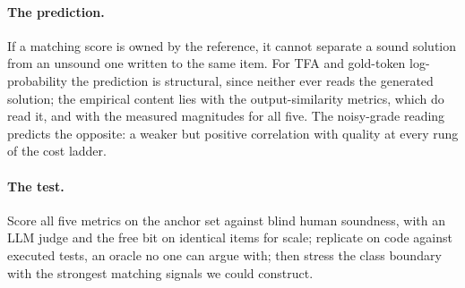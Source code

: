 \documentclass[11pt]{article}
\newcommand{\tfa}{\textsc{TFA}}
\begin{document}
\paragraph{The prediction.}
If a matching score is owned by the reference, it cannot separate a sound solution from an unsound one written to the same item.
For \tfa{} and gold-token log-probability the prediction is structural, since neither ever reads the generated solution; the empirical content lies with the output-similarity metrics, which do read it, and with the measured magnitudes for all five.
The noisy-grade reading predicts the opposite: a weaker but positive correlation with quality at every rung of the cost ladder.

\paragraph{The test.}
Score all five metrics on the anchor set against blind human soundness, with an LLM judge and the free bit on identical items for scale; replicate on code against executed tests, an oracle no one can argue with; then stress the class boundary with the strongest matching signals we could construct.
\end{document}
